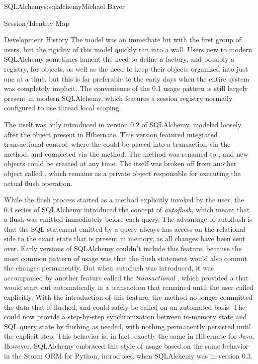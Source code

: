 \begin{aosachapter}{SQLAlchemy}{s:sqlalchemy}{Michael Bayer}
\begin{aosasect1}{Session/Identity Map}
\begin{aosasect2}{Development History}
The  model was an immediate hit with the first group
of users, but the rigidity of this model
quickly ran into a wall. Users new to modern SQLAlchemy
sometimes lament the need to define a factory, and possibly a registry, for
 objects, as well as the need to keep their objects organized into
just one  at a time, but this is far
preferable to the early days when the entire system was completely implicit. The
convenience of the 0.1 usage pattern is still largely present in modern
SQLAlchemy, which features a session registry normally configured to
use thread local scoping.

The  itself was only introduced in version 0.2 of SQLAlchemy,
modeled loosely after the  object present in Hibernate.   This version featured
integrated transactional control, where the  could
be placed into a transaction via the  method, and completed
via the  method.   The  method
was renamed to , and new  objects
could be created at any time.   The  itself was broken off
from another object called , which remains as a private
object responsible for executing the actual flush operation.

While the flush process started as a method explicitly invoked by the
user, the 0.4 series of SQLAlchemy introduced the concept of \emph{autoflush},
which meant that a flush was emitted immediately before each query. The advantage
of autoflush is that the SQL statement emitted by a query always has
access on the relational side to the exact state that is present in memory,
as all changes have been sent over. Early versions of SQLAlchemy
couldn't include this feature, because the most common pattern of usage was
that the flush statement would also commit the changes permanently.
But when autoflush was introduced, it was accompanied by another feature
called the \emph{transactional} , which provided a
 that would start out automatically in a transaction that
remained until the user called  explicitly.
With the introduction of this feature, the  method no
longer committed the data that it flushed, and could safely
be called on an automated basis.   The  could now
provide a step-by-step
synchronization between in-memory state and SQL query state by flushing
as needed, with nothing
permanently persisted until the explicit  step. This behavior is, in fact,
exactly the same in Hibernate for Java.  However, SQLAlchemy embraced
this style of usage based on the same behavior in the Storm ORM for Python, introduced
when SQLAlchemy was in version 0.3.


\end{aosasect2}
\end{aosasect1}
\end{aosachapter}
